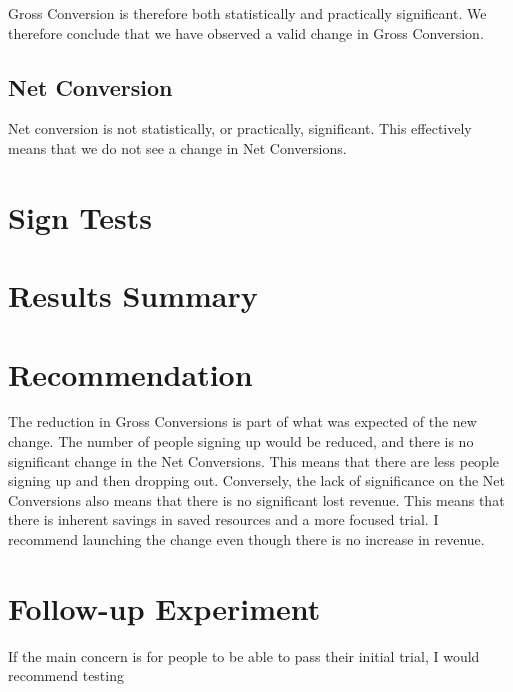 \documentclass[12pt,a4paper]{article}
\begin{document}
Gross Conversion is therefore both statistically and practically significant. We
therefore conclude that we have observed a valid change in Gross Conversion.

\subsection{Net Conversion}

Net conversion is not statistically, or practically, significant. This
effectively means that we do not see a change in Net Conversions.

\section{Sign Tests}

\section{Results Summary}

\section{Recommendation}
The reduction in Gross Conversions is part of what was expected of the new
change. The number of people signing up would be reduced, and there is no
significant change in the Net Conversions. This means that there are less people
signing up and then dropping out. Conversely, the lack of significance on the
Net Conversions also means that there is no significant lost revenue. This means
that there is inherent savings in saved resources and a more focused trial. I
recommend launching the change even though there is no increase in revenue.

\section{Follow-up Experiment}
If the main concern is for people to be able to pass their initial trial, I
would recommend testing
\end{document}
